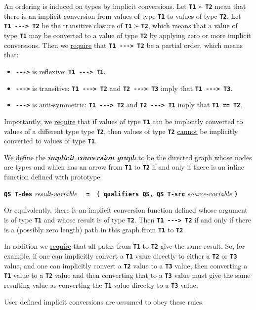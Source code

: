 \documentclass[12pt]{article}
\newcommand{\TT}[1]{{\tt \bfseries #1}}
\newcommand{\key}[1]{{\bf \em #1}\index{#1}}
\begin{document}
An ordering is induced on types by implicit conversions.  Let
\TT{T1}$\succ$\TT{T2} mean that there is an implicit conversion from
values of type \TT{T1} to values of type \TT{T2}.  Let \TT{T1~-{}-{}->~T2}
be the transitive closure of \TT{T1}$\succ$\TT{T2}, which means
that a value of type \TT{T1} may be converted to a value
of type \TT{T2} by applying zero or more implicit conversions.
Then we \underline{require}
that \TT{T1~-{}-{}->~T2} be a partial order, which means that:
\begin{itemize}
\item \TT{-{}-{}->} is reflexive: \TT{T1~-{}-{}->~T1}.
\item \TT{-{}-{}->} is transitive: \TT{T1~-{}-{}->~T2} and \TT{T2~-{}-{}->~T3}
imply that \TT{T1~-{}-{}->~T3}.
\item \TT{-{}-{}->} is anti-symmetric:
\TT{T1~-{}-{}->~T2} and \TT{T2~-{}-{}->~T1}
imply that \TT{T1~==~T2}.
\end{itemize}

Importantly, we \underline{require} that
if values of type \TT{T1} can be implicitly converted to
values of a different type type \TT{T2}, then values of type \TT{T2}
\underline{cannot} be implicitly converted to values of type \TT{T1}.

We define the \key{implicit conversion graph} to be the directed
graph whose nodes are types and which has an arrow from \TT{T1} to
\TT{T2} if and only if there is an inline function defined with
prototype:
\begin{center}
\TT{QS T-des} {\em result-variable}%
    ~~\TT{=}~~\TT{( qualifiers QS, QS T-src} {\em source-variable} \TT{)}
\end{center}
Or equivalently, there is an implicit conversion function defined
whose argument is of type \TT{T1} and whose result is of type \TT{T2}.
Then \TT{T1~-{}-{}->~T2} if and only if there is a (possibly zero length)
path in this graph from \TT{T1} to \TT{T2}.

In addition we \underline{require} that all paths
from \TT{T1} to \TT{T2} give the same result.
So, for example, if one can implicitly convert a \TT{T1} value directly to
either a \TT{T2} or \TT{T3} value, and one can implicitly convert
a \TT{T2} value to a \TT{T3} value, then converting a \TT{T1} value
to a \TT{T2} value and then converting that to a \TT{T3} value
must give the same resulting value as converting the \TT{T1} value
directly to a \TT{T3} value.

User defined implicit conversions are assumed to obey these rules.
\end{document}
